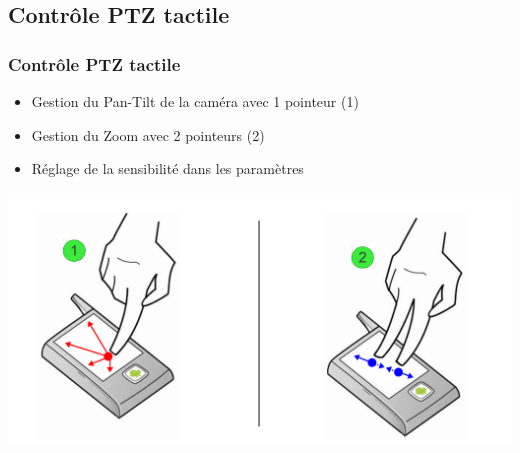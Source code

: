 \subsection{Contrôle PTZ tactile}
  \begin{frame}
   \frametitle{Contrôle PTZ tactile}

  \centering
  \begin{minipage}{0.85\textwidth}
    \begin{itemize}
      \item Gestion du Pan-Tilt de la caméra  avec 1 pointeur
      (1)
      \item Gestion du Zoom avec 2 pointeurs (2)
      \item Réglage de la sensibilité dans les paramètres
   	\end{itemize}
   	\end{minipage}
   	
   \includegraphics[scale=0.48]{Images/ImageSlide8.pdf}

  \end{frame}
